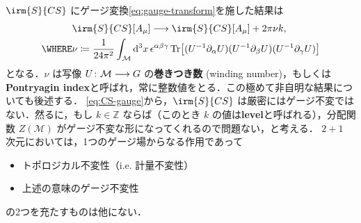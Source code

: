 \documentclass[TQFT_main]{subfiles}
\begin{document}
$\irm{S}{CS}$ にゲージ変換\eqref{eq:gauge-transform}を施した結果は
\begin{align}
    &\irm{S}{CS}[A_\mu] \lto \irm{S}{CS}[A_\mu] + 2\pi \nu k, \label{eq:CS-gauge} \\
    \WHERE &\nu \coloneqq \frac{1}{24 \pi^2} \int_{\mathcal{M}} \dd[3]{x} \epsilon^{\alpha\beta\gamma} \Tr \bigl[ (U^{-1} \partial_\alpha U)(U^{-1} \partial_\beta U)(U^{-1} \partial_\gamma U) \bigr] 
\end{align}
となる．$\nu$ は写像 $U \colon \mathcal{M} \longrightarrow G$ の\textbf{巻きつき数} (winding number)，もしくは\textbf{Pontryagin index}と呼ばれ，常に整数値をとる．この極めて非自明な結果についても後述する．
\eqref{eq:CS-gauge}から，$\irm{S}{CS}$ は厳密にはゲージ不変ではない．然るに，もし $k \in \mathbb{Z}$ ならば（このとき $k$ の値は\textbf{level}と呼ばれる），分配関数 $Z (\mathcal{M})$ がゲージ不変な形になってくれるので問題ない，と考える．
$2+1$ 次元においては，1つのゲージ場からなる作用であって
\begin{itemize}
    \item トポロジカル不変性（i.e. 計量不変性）
    \item 上述の意味のゲージ不変性
\end{itemize}
の2つを充たすものは他にない．


\end{document}
